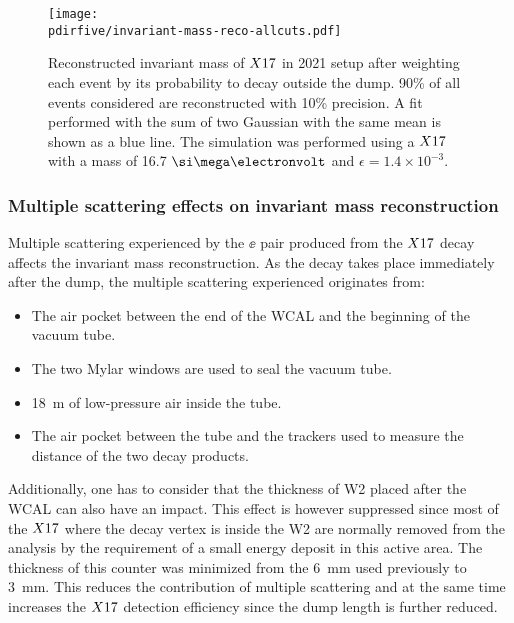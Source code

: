 \begin{figure}[tbh!]
  \centering
  \texttt{[image: \\pdirfive/invariant-mass-reco-allcuts.pdf]}
  \caption[Invariant mass reconstruction in 2021 setup]{Reconstructed invariant mass of $X17$ in 2021 setup after weighting each event by its probability to decay outside the dump. 90\% of all events considered are reconstructed with 10\% precision. A fit performed with the sum of two Gaussian with the same mean is shown as a blue line. The simulation was performed using a $X17$ with a mass of 16.7 $\mev$ and $\epsilon = 1.4\times10^{-3}$.}
    \label{fig:imassreco}
  \end{figure}

\subsubsection{Multiple scattering effects on invariant mass reconstruction}
\label{ch5:sec:mm-scattering}

Multiple scattering experienced by the $\ee$ pair produced from the $X17$ decay affects the invariant mass reconstruction. As the decay takes place immediately after the dump, the multiple scattering experienced originates from:

\begin{itemize}
\item The air pocket between the end of the WCAL and the beginning of the vacuum tube.
\item The two Mylar windows are used to seal the vacuum tube.
\item \SI{18}{\meter} of low-pressure air inside the tube.
\item The air pocket between the tube and the trackers used to measure the distance of the two decay products.
\end{itemize}

Additionally, one has to consider that the thickness of W2 placed after the WCAL can also have an impact. This effect is however suppressed since most of the $X17$ where the decay vertex is inside the W2 are normally removed from the analysis by the requirement of a small energy deposit in this active area. The thickness of this counter was minimized from the \SI{6}{\milli\meter} used previously to \SI{3}{\milli\meter}. This reduces the contribution of multiple scattering and at the same time increases the $X17$ detection efficiency since the dump length is further reduced.

